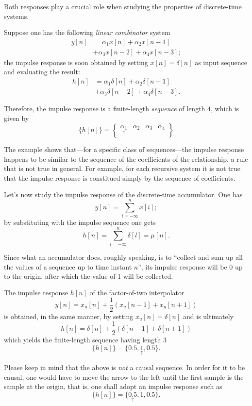\documentclass[\documentfontsize, twocolumn]{\classname}
\begin{document}
Both responses play a crucial role when studying the properties of discrete-time systems.

Suppose one has the following \emph{linear combinator} system
\begin{align*}
    y[n] &= \alpha_1 x[n] + \alpha_2 x[n-1]\\
         &+ \alpha_3 x[n-2] + \alpha_4 x[n-3];
\end{align*}
the impulse response is soon obtained by setting $x[n] = \delta[n]$ as input sequence and evaluating the result:
\begin{align*}
    h[n] &= \alpha_1 \delta[n] + \alpha_2 \delta[n-1]\\
         &+ \alpha_3 \delta[n-2] + \alpha_4 \delta[n-3].
\end{align*}

Therefore, the impulse response is a finite-length \emph{sequence} of length $4$, which is given by
\[
    \{h[n]\} = \begin{Bmatrix}\underset{\uparrow}{\alpha_1} & \alpha_2 & \alpha_3 & \alpha_4\end{Bmatrix}
\]

The example shows that---for a specific class of sequences---the impulse response happens to be similar to the sequence of the coefficients of the relationship, a rule that is not true in general. For example, for each recursive system it is not true that the impulse response is constitued simply by the sequence of coefficients.

Let's now study the impulse response of the discrete-time accumulator. One has
\[
    y[n] = \sum_{i=-\infty}^{n} x[i];
\]
by substituting with the impulse sequence one gets
\[
    h[n] = \sum_{i=-\infty}^{n} \delta[l] = \mu[n].
\]

Since what an accumulator does, roughly speaking, is to ``collect and sum up all the values of a sequence up to time instant $n$'', its impulse response will be $0$ up to the origin, after which the value of $1$ will be collected.

The impulse response $h[n]$ of the factor-of-two interpolator
\[
    y[n] = x_u[n] + \frac 1 2(x_u[n-1] + x_u[n+1])
\]
is obtained, in the same manner, by setting $x_u[n]=\delta[n]$ and is ultimately
\[
    h[n] = \delta[n] + \frac 1 2(\delta[n-1] + \delta[n+1])
\]
which yields the finite-length sequence having length $3$
\[
    \{h[n]\} = \{0.5, \underset{\uparrow}{1}, 0.5\}.
\]

Please keep in mind that the above is \emph{not} a causal sequence. In order for it to be causal, one would have to move the arrow to the left until the first sample is the sample at the origin, that is, one shall adopt an impulse response such as
\[
    \{h[n]\} = \{\underset{\uparrow}{0.5}, 1, 0.5\}.
\]
\end{document}

